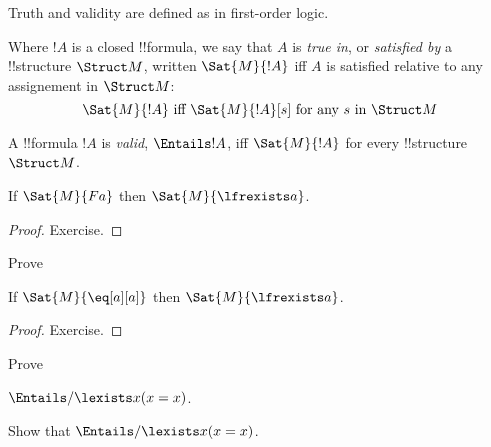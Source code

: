 \documentclass[../../../include/open-logic-section]{subfiles}
\begin{document}
Truth and validity are defined as in first-order logic.

\begin{defn}[Truth]
Where $!A$ is a closed !!{formula}, we say that $A$ is \emph{true in}, or
\emph{satisfied by} a !!{structure} $\Struct M$, written $\Sat{M}{!A}$ iff 
$A$ is satisfied relative to any assignement in $\Struct M$:
$$\Sat{M}{!A}\textrm{ iff }\Sat{M}{!A}[s]\textrm{ for any }s\textrm{ in }\Struct M$$
\end{defn}

\begin{defn}[Validity]
  A !!{formula} $!A$ is \emph{valid}, $\Entails !A$, iff $\Sat{M}{!A}$ for every
  !!{structure}~$\Struct M$.
\end{defn}

\begin{prop}
  If $\Sat{M}{Fa}$ then $\Sat{M}{\lfrexists a}$.
\end{prop}

\begin{proof}
  Exercise.
\end{proof}

\begin{prob}
  Prove 
\end{prob}

\begin{prop}
  If $\Sat{M}{\eq[a][a]}$ then $\Sat{M}{\lfrexists a}$.
\end{prop}

\begin{proof}
  Exercise.
\end{proof}

\begin{prob}
  Prove 
\end{prob}

\begin{prop}
  $\Entails/ \lexists x (x = x)$.
\end{prop}

\begin{prob}
Show that $\Entails/ \lexists x (x = x)$.
\end{prob}
\end{document}
